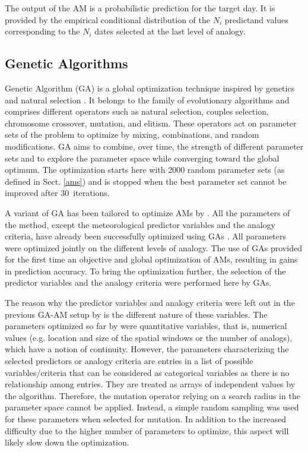 \documentclass[draft]{agujournal2019}
\begin{document}
The output of the AM is a probabilistic prediction for the target day. It is provided by the empirical conditional distribution of the $N_{i}$ predictand values corresponding to the $N_{i}$ dates selected at the last level of analogy.


\subsection{Genetic Algorithms}
\label{gas}

Genetic Algorithm (GA) is a global optimization technique inspired by genetics and natural selection \cite{Holland1992b}. It belongs to the family of evolutionary algorithms and comprises different operators such as natural selection, couples selection, chromosome crossover, mutation, and elitism. These operators act on parameter sets of the problem to optimize by mixing, combinations, and random modifications. GA aims to combine, over time, the strength of different parameter sets and to explore the parameter space while converging toward the global optimum. The optimization starts here with 2000 random parameter sets (as defined in Sect. \ref{ams}) and is stopped when the best parameter set cannot be improved after 30~iterations.

A variant of GA has been tailored to optimize AMs by . All the parameters of the method, except the meteorological predictor variables and the analogy criteria, have already been successfully optimized using GAs \cite{Horton2018a}. All parameters were optimized jointly on the different levels of analogy. The use of GAs provided for the first time an objective and global optimization of AMs, resulting in gains in prediction accuracy. To bring the optimization further, the selection of the predictor variables and the analogy criteria were performed here by GAs.

The reason why the predictor variables and analogy criteria were left out in the previous GA-AM setup by  is the different nature of these variables. The parameters optimized so far by  were quantitative variables, that is, numerical values (e.g. location and size of the spatial windows or the number of analogs), which have a notion of continuity. However, the parameters characterizing the selected predictors or analogy criteria are entries in a list of possible variables/criteria that can be considered as categorical variables as there is no relationship among entries. They are treated as arrays of independent values by the algorithm. Therefore, the mutation operator relying on a search radius in the parameter space \cite{Horton2017a} cannot be applied. Instead, a simple random sampling was used for these parameters when selected for mutation. In addition to the increased difficulty due to the higher number of parameters to optimize, this aspect will likely slow down the optimization.
\end{document}
